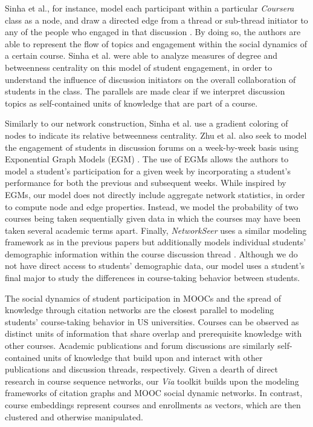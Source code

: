 \documentclass{sigchi}
\begin{document}
Sinha et al., for instance, model each participant within a particular \textit{Coursera} class as a node, and draw a directed edge from a thread or sub-thread initiator to any of the people who engaged in that discussion \cite{Sinha2014}. By doing so, the authors are able to represent the flow of topics and engagement within the social dynamics of a certain course. Sinha et al. were able to analyze measures of degree and betweenness centrality on this model of student engagement, in order to understand the influence of discussion initiators on the overall collaboration of students in the class. The parallels are made clear if we interpret discussion topics as self-contained units of knowledge that are part of a course. 

Similarly to our network construction, Sinha et al. use a gradient
coloring of nodes to indicate its relative betweenness
centrality. Zhu et al. also seek to model the engagement of
students in discussion forums on a week-by-week basis using
Exponential Graph Models (EGM) \cite{Zhu2016}. The use of EGMs allows
the authors to model a student's participation for a given week by
incorporating a student's performance for both the previous and
subsequent weeks. While inspired by EGMs, our model does not directly
include aggregate network statistics, in order to compute node and edge
properties. Instead, we model the probability of two courses
being taken sequentially given data in which the courses may have been
taken several academic terms apart. Finally, \textit{NetworkSeer} uses a similar modeling framework as in the previous papers but additionally models individual students' demographic information within the course discussion thread \cite{Wu2016}. Although we do not have direct access to students' demographic data, our model uses a student's final major to study the differences in course-taking behavior between students.


The social dynamics of student participation in MOOCs and the spread
of knowledge through citation networks are the closest parallel to
modeling students' course-taking behavior in US universities. Courses can
be observed as distinct units of information that share overlap and
prerequisite knowledge with other courses. Academic publications and
forum discussions are similarly self-contained units of knowledge that
build upon and interact with other publications and discussion
threads, respectively. Given a dearth of direct research in course
sequence networks, our \textit{Via} toolkit builds upon the modeling
frameworks of citation graphs and MOOC social dynamic networks. In
contrast, course embeddings \cite{pard2018} represent courses and
enrollments as vectors, which are then clustered and otherwise
manipulated.
\end{document}
